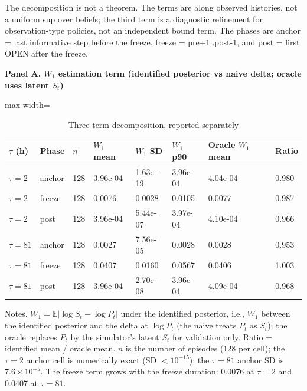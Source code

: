 \begin{table}[!htbp]
\centering
\scriptsize
\caption{Three-term decomposition, reported separately}
\label{tab:b1}
\par\noindent\begin{minipage}{\linewidth}\raggedright{\scriptsize The decomposition is not a theorem. The terms are along observed histories, not a uniform sup over beliefs; the third term is a diagnostic refinement for observation-type policies, not an independent bound term. The phases are anchor = last informative step before the freeze, freeze = pre+1..post-1, and post = first OPEN after the freeze.}\end{minipage}\par

\par\textbf{Panel A. $W_1$ estimation term (identified posterior vs naive delta; oracle uses latent $S_t$)}

\begin{adjustbox}{max width=\linewidth}
\begin{tabular}{@{}llllllll@{}}
\toprule
$\tau$ (h) & Phase & $n$ & $W_1$ mean & $W_1$ SD & $W_1$ p90 & Oracle $W_1$ mean & Ratio \\
\midrule
$\tau=2$ & anchor & 128 & 3.96e-04 & 1.63e-19 & 3.96e-04 & 4.04e-04 & 0.980 \\
$\tau=2$ & freeze & 128 & 0.0076 & 0.0028 & 0.0105 & 0.0077 & 0.987 \\
$\tau=2$ & post & 128 & 3.96e-04 & 5.44e-07 & 3.97e-04 & 4.10e-04 & 0.966 \\
$\tau=81$ & anchor & 128 & 0.0027 & 7.56e-05 & 0.0028 & 0.0028 & 0.953 \\
$\tau=81$ & freeze & 128 & 0.0407 & 0.0160 & 0.0567 & 0.0406 & 1.003 \\
$\tau=81$ & post & 128 & 3.96e-04 & 2.70e-08 & 3.96e-04 & 4.09e-04 & 0.968 \\
\bottomrule
\end{tabular}
\end{adjustbox}
\vspace{0.5em}
\par\noindent\begin{minipage}{\linewidth}\raggedright{\scriptsize Notes. $W_1 = \mathbb{E}|\log S_t - \log P_t|$ under the identified posterior, i.e., $W_1$ between the identified posterior and the delta at $\log P_t$ (the naive treats $P_t$ as $S_t$); the oracle replaces $P_t$ by the simulator's latent $S_t$ for validation only. Ratio = identified mean / oracle mean. $n$ is the number of episodes (128 per cell); the $\tau=2$ anchor cell is numerically exact (SD $<10^{-15}$); the $\tau=81$ anchor SD is $7.6\times10^{-5}$. The freeze term grows with the freeze duration: 0.0076 at $\tau=2$ and 0.0407 at $\tau=81$.}\end{minipage}\par


\end{table}

